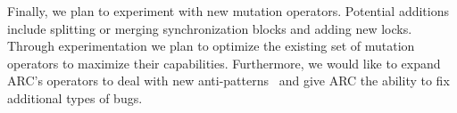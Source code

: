 
%
Finally, we plan to experiment with new mutation operators. Potential additions include splitting
or merging synchronization blocks and adding new locks. Through experimentation
we plan to optimize the existing set of mutation operators to maximize their
capabilities.  %
Furthermore, we would like to expand ARC's operators to deal with new anti-patterns~\cite{BJ09, FKLV12,
BCD06} and give ARC the ability to fix additional types of bugs. %
